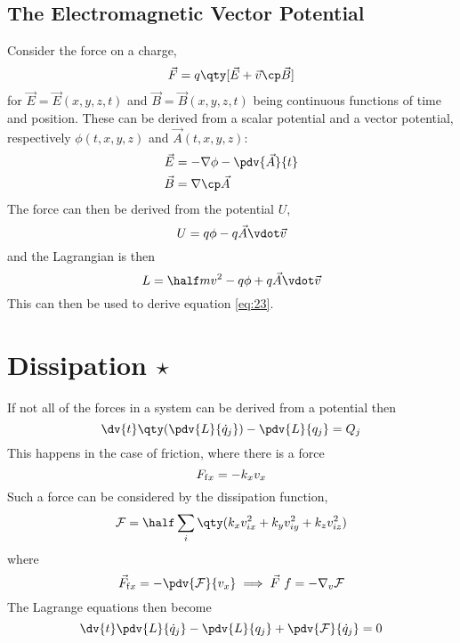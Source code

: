 \subsection{The Electromagnetic Vector Potential}
\label{sec:electr-vect-potent}

Consider the force on a charge,
\begin{equation}
  \label{eq:23}
  \vec{F} = q \qty[ \vec{E} + \vec{v} \cp \vec{B}]
\end{equation}
for $\vec{E} = \vec{E}(x,y,z,t)$ and $\vec{B} = \vec{B}(x,y,z,t)$
being continuous functions of time and position. These can be derived
from a scalar potential and a vector potential, respectively
$\phi(t,x,y,z)$ and $\vec{A}(t,x,y,z)$:
\begin{subequations}
\begin{align}
\vec{E} & = - \nabla \phi - \pdv{\vec{A}}{t} \\ 
\vec{B} & = \nabla \cp \vec{A}  
\end{align}
\end{subequations}
The force can then be derived from the potential $U$,
\begin{equation}
  \label{eq:24}
  U = q \phi - q \vec{A} \vdot \vec{v}
\end{equation}
and the Lagrangian is then
\begin{equation}
  \label{eq:25}
  L = \half m v^2 - q \phi + q \vec{A} \vdot \vec{v}
\end{equation}
This can then be used to derive equation \eqref{eq:23}.

\section{Dissipation $\star$}
\label{sec:dissipation}

If not all of the forces in a system can be derived from a potential
then
\begin{equation}
  \label{eq:26}
  \dv{t} \qty( \pdv{L}{\dot{q}_j} ) - \pdv{L}{q_j} = Q_j
\end{equation}
This happens in the case of friction, where there is a force 
\[ F_{{\rm f}x} = - k_x v_x \]
Such a force can be considered by the dissipation function,
\begin{equation}
  \label{eq:27}
  \mathcal{F} = \half \sum_i \qty( k_x v_{ix}^2 + k_y v_{iy}^2 + k_z v_{iz}^2 )
\end{equation}
where 
\[ \vec{F}_{{\rm f}x} = - \pdv{\mathcal{F}}{v_x} \implies \vec{F}~{f} = - \nabla_v \mathcal{F} \]
The Lagrange equations then become
\begin{equation}
  \label{eq:28}
  \dv{t} \pdv{L}{\dot{q}_j} - \pdv{L}{q_j} + \pdv{\mathcal{F}}{\dot{q}_j} = 0 
\end{equation}

